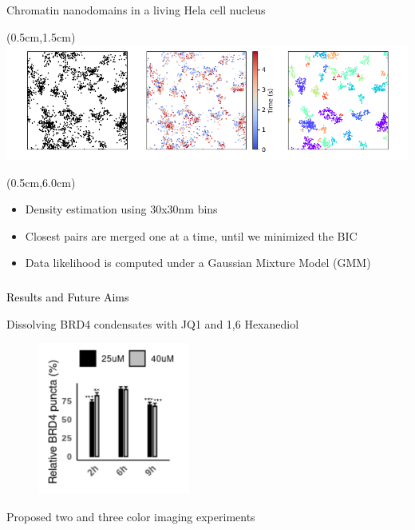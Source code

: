 \documentclass{beamer}					%
\begin{document}
\begin{frame}{Chromatin nanodomains in a living Hela cell nucleus}

\begin{textblock*}{13cm}(0.5cm,1.5cm)
\includegraphics[width=\textwidth]{Cluster2.png}
\end{textblock*}

\begin{textblock*}{13cm}(0.5cm,6.0cm)
\begin{itemize}
\item Density estimation using 30x30nm bins
\item Closest pairs are merged one at a time, until we minimized the BIC
\item Data likelihood is computed under a Gaussian Mixture Model (GMM)
\end{itemize}
\end{textblock*}

\end{frame}




\begin{frame}
\frametitle{}
\centering
\Large \textcolor{black}{Results and Future Aims}
\end{frame}


\begin{frame}{Dissolving BRD4 condensates with JQ1 and 1,6 Hexanediol}
\begin{figure}
\includegraphics[width=5cm]{BRD4-JQ1.png}
\end{figure}
\end{frame}

\begin{frame}{}
Proposed two and three color imaging experiments
\end{frame}
\end{document}
